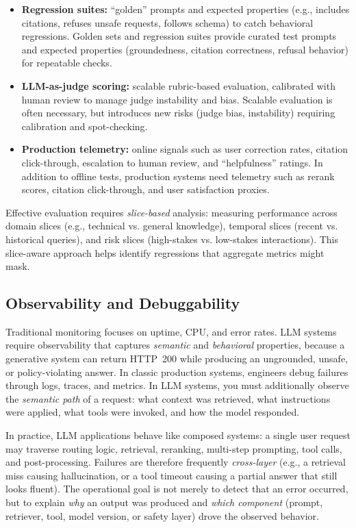 \begin{itemize}
  \item \textbf{Regression suites:} ``golden'' prompts and expected properties (e.g., includes citations, refuses unsafe requests, follows schema) to catch behavioral regressions. Golden sets and regression suites provide curated test prompts and expected properties (groundedness, citation correctness, refusal behavior) for repeatable checks.
  \item \textbf{LLM-as-judge scoring:} scalable rubric-based evaluation, calibrated with human review to manage judge instability and bias. Scalable evaluation is often necessary, but introduces new risks (judge bias, instability) requiring calibration and spot-checking.
  \item \textbf{Production telemetry:} online signals such as user correction rates, citation click-through, escalation to human review, and ``helpfulness'' ratings. In addition to offline tests, production systems need telemetry such as rerank scores, citation click-through, and user satisfaction proxies.
\end{itemize}

Effective evaluation requires \emph{slice-based} analysis: measuring performance across domain slices (e.g., technical vs. general knowledge), temporal slices (recent vs. historical queries), and risk slices (high-stakes vs. low-stakes interactions). This slice-aware approach helps identify regressions that aggregate metrics might mask.

\subsection{Observability and Debuggability}
Traditional monitoring focuses on uptime, CPU, and error rates. LLM systems require observability that captures \emph{semantic} and \emph{behavioral} properties, because a generative system can return HTTP~200 while producing an ungrounded, unsafe, or policy-violating answer. In classic production systems, engineers debug failures through logs, traces, and metrics. In LLM systems, you must additionally observe the \emph{semantic path} of a request: what context was retrieved, what instructions were applied, what tools were invoked, and how the model responded.

In practice, LLM applications behave like composed systems: a single user request may traverse routing logic, retrieval, reranking, multi-step prompting, tool calls, and post-processing. Failures are therefore frequently \emph{cross-layer} (e.g., a retrieval miss causing hallucination, or a tool timeout causing a partial answer that still looks fluent). The operational goal is not merely to detect that an error occurred, but to explain \emph{why} an output was produced and \emph{which component} (prompt, retriever, tool, model version, or safety layer) drove the observed behavior.

